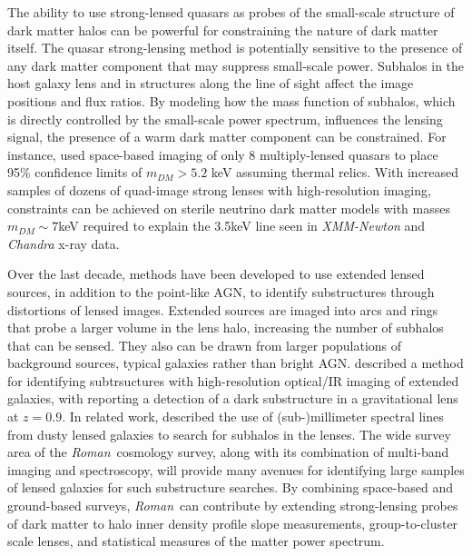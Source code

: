 \documentclass[11pt]{article}
\newcommand{\RST}{\emph{Roman}~}
\begin{document}
The ability to use strong-lensed quasars as probes of the small-scale structure of dark matter halos
can be powerful for constraining the nature of dark matter itself. The quasar strong-lensing method is
potentially sensitive to the presence of any
dark matter component that may suppress small-scale power. Subhalos in the host galaxy lens and
in structures along the line of sight\citep{hsueh2020a} affect the image positions and flux ratios. By
modeling how the mass function of subhalos, which is directly controlled by the small-scale
power spectrum, influences the lensing signal, the presence of a warm dark matter component can
be constrained. For instance, \cite[Gilman et al. 2020][]{gilman2020a} used space-based imaging\citep{nierenberg2020a}
of only 8 multiply-lensed quasars to place 95\% confidence limits of $m_{DM}>5.2$ keV assuming thermal relics.
With increased samples of dozens of quad-image strong lenses with high-resolution imaging, constraints can be
achieved\citep{despali2020a} on sterile neutrino dark matter models with masses $m_{DM}\sim7$keV required to explain the 3.5keV line seen in \emph{XMM-Newton} and \emph{Chandra} x-ray
data\citep{bulbul2014a,boyarsky2015a,cappelluti2018a}.

Over the last decade, methods have been developed to use extended lensed sources, in addition to the
point-like AGN, to identify substructures through distortions of lensed images. Extended sources
are imaged into arcs and rings that probe a larger volume in the lens halo, increasing the number
of subhalos that can be sensed. They also can be drawn from larger populations of background
sources, typical galaxies rather than bright AGN. \cite[Vegetti \& Koopman (2009)][]{vegetti2009a} described a
method for identifying subtrsuctures with high-resolution optical/IR imaging of extended
galaxies, with \cite[Vegetti et al. (2012)][]{vegetti2012a} reporting a detection of a dark substructure in a gravitational
lens at $z=0.9$. 
In related work, \cite[Hezaveh et al. (2013, 2016a)][]{hezaveh2013a,hezaveh2016a} described the use of (sub-)millimeter
spectral lines from dusty lensed galaxies to search for subhalos in the lenses. The wide survey
area of the \RST cosmology survey, along with its combination of multi-band imaging and spectroscopy, will provide
many avenues for identifying large samples of lensed galaxies for such substructure searches.
By combining space-based and ground-based surveys\citep{agnello2018a,anguita2018a,everett2020a}, 
\RST can contribute by extending strong-lensing probes of dark matter to halo inner density
profile slope measurements\citep{gavazzi2007a,wong2017a}, group-to-cluster scale lenses\citep{jaelani2020a},
and statistical measures of the matter power spectrum\citep{diaz_rivero2018a}.
\end{document}
